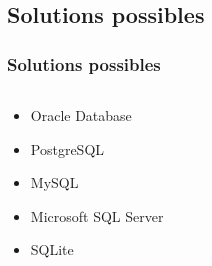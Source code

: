 \subsection[Solutions possibles]{Solutions possibles}
\begin{frame}
\frametitle{Solutions possibles}
\begin{columns}
\begin{column}{5cm}
\begin{itemize}[<+->]
	\item<2-> Oracle Database
	\item<3-> PostgreSQL
	\item<4-> MySQL
	\item<5-> Microsoft SQL Server
	\item<6-> SQLite
\end{itemize}
\end{column}
\begin{column}{7cm}


\end{column}
\end{columns}
\end{frame}
